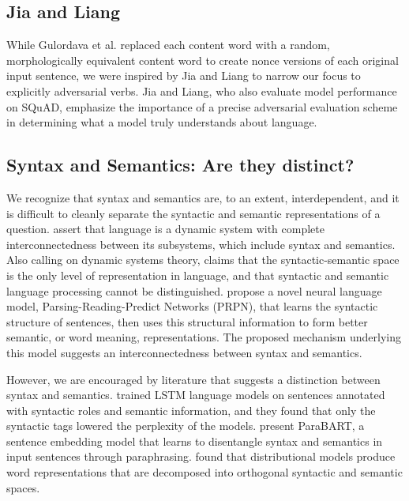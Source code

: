 \documentclass[11pt,a4paper]{article}
\begin{document}
\subsection{Jia and Liang} 
While Gulordava et al. replaced each content word with a random, morphologically equivalent content word to create nonce versions of each original input sentence, we were inspired by Jia and Liang to narrow our focus to explicitly adversarial verbs. Jia and Liang, who also evaluate model performance on SQuAD, emphasize the importance of a precise adversarial evaluation scheme in determining what a model truly understands about language.

\subsection{Syntax and Semantics: Are they distinct?}

We recognize that syntax and semantics are, to an extent, interdependent, and it is difficult to cleanly separate the syntactic and semantic representations of a question. \citet{de_bot_lowie_verspoor_2007} assert that language is a dynamic system with complete interconnectedness between its subsystems, which include syntax and semantics. Also calling on dynamic systems theory, \citet{ART002728950} claims that the syntactic-semantic space is the only level of representation in language, and that syntactic and semantic language processing cannot be distinguished. \citet{DBLP:journals/corr/abs-1711-02013} propose a novel neural language model, Parsing-Reading-Predict Networks (PRPN), that learns the syntactic structure of sentences, then uses this structural information to form better semantic, or word meaning, representations. The proposed mechanism underlying this model suggests an interconnectedness between syntax and semantics.

However, we are encouraged by literature that suggests a distinction between syntax and semantics. \citet{ek-etal-2019-language} trained LSTM language models on sentences annotated with syntactic roles and semantic information, and they found that only the syntactic tags lowered the perplexity of the models. \citet{DBLP:journals/corr/abs-2104-05115} present ParaBART, a sentence embedding model that learns to disentangle syntax and semantics in input  sentences through paraphrasing. \citet{mitchell-steedman-2015-orthogonality} found that distributional models produce word representations that are decomposed into orthogonal syntactic and semantic spaces. 
\end{document}
